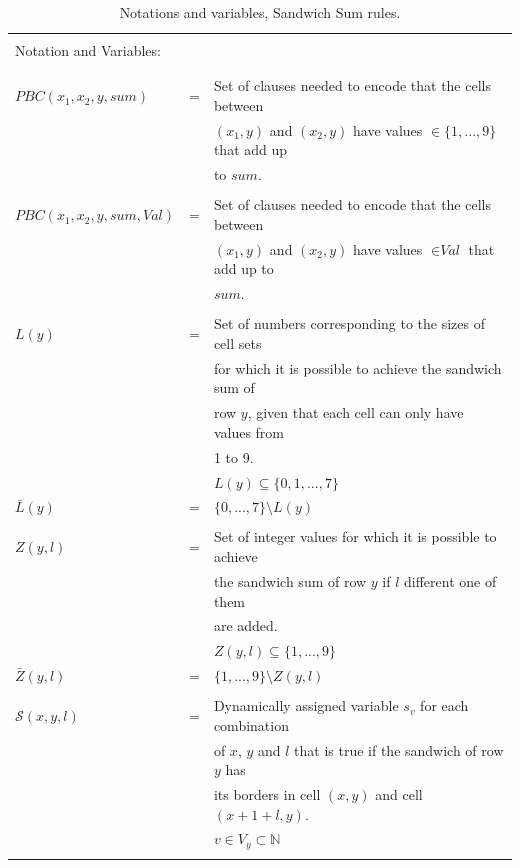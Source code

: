 \begin{table}
    \centering
    \begin{tabular*}{\textwidth}{l c l}
    \hline
    \\
    Notation and Variables: &&\\
    \\
    \hline
    \\
    $PBC(x_1,x_2,y,sum)$    &= &Set of clauses needed to encode that the cells between\\
                            &  &$(x_1,y)$ and $(x_2,y)$ have values $\in \{1,...,9\}$ that add up\\
                            &  &to $sum$.\\
    \\
    $PBC(x_1,x_2,y,sum,Val)$&= &Set of clauses needed to encode that the cells between\\
                            &  &$(x_1,y)$ and $(x_2,y)$ have values $\in \textit{Val}$ that add up to\\
                            &  &$sum$.\\
    \\
    $L(y)$                  &= &Set of numbers corresponding to the sizes of cell sets\\
                            &  &for which it is possible to achieve the sandwich sum of\\
                            &  &row $y$, given that each cell can only have values from\\
                            &  &1 to 9.\\
                            &  &$L(y)\subseteq \{0,1,...,7\}$
    \\
    $\bar{L}(y)$            &= &$\{0,...,7\}\setminus L(y)$\\
    \\
    $Z(y,l)$                &= &Set of integer values for which it is possible to achieve\\
                            &  &the sandwich sum of row $y$ if $l$ different one of them\\
                            &  &are added.\\
                            &  &$Z(y,l)\subseteq \{1,...,9\}$
    \\
    $\bar{Z}(y,l)$          &= &$\{1,...,9\}\setminus Z(y,l)$\\
    \\
    $\mathcal{S}(x,y,l)$    &= &Dynamically assigned variable $s_v$ for each combination\\
                            &  &of $x$, $y$ and $l$ that is true if the sandwich of row $y$ has\\
                            &  &its borders in cell $(x,y)$ and cell $(x+1+l,y)$. \\
                            &  &$v \in V_y \subset \mathbb{N}$\\
    \\
    \hline
    \end{tabular*}
    \caption{Notations and variables, Sandwich Sum rules.}
    \label{notation:SandwichSum}
\end{table}




